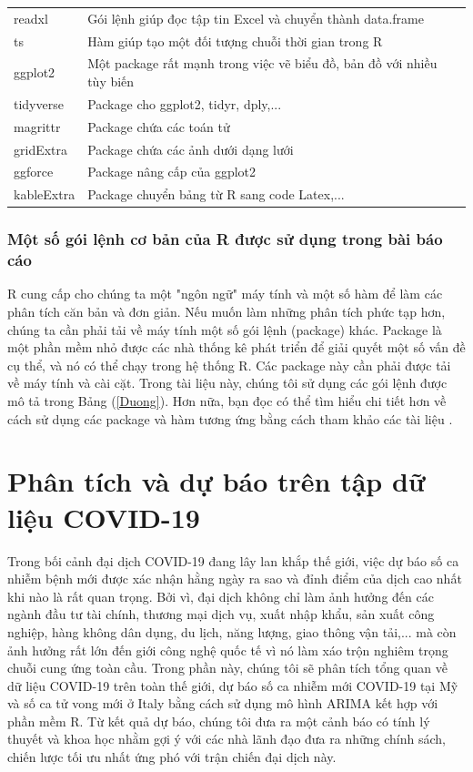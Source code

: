 \documentclass[12pt, a4paper,oneside]{book}
\theoremstyle{definition}
\begin{document}
\begin{longtable}{p{3.2cm}p{11cm}}
	readxl & Gói lệnh giúp đọc tập tin Excel và chuyển thành data.frame \\
	\rowcolor{gray!6} ts  & Hàm giúp tạo một đối tượng chuỗi thời gian trong R \\
	ggplot2 & Một package rất mạnh trong việc vẽ biểu đồ, bản đồ với nhiều tùy biến\\
	\rowcolor{gray!6} tidyverse& Package cho ggplot2, tidyr,  dply,...\\
    magrittr & Package chứa các toán tử\\
    \rowcolor{gray!6}gridExtra & Package chứa các ảnh dưới dạng lưới\\
    ggforce&  Package nâng cấp của ggplot2\\
    \rowcolor{gray!6} kableExtra &Package chuyển bảng từ R sang code Latex,... \\
	\bottomrule
\end{longtable}
\endgroup{} 
\subsubsection*{Một số gói lệnh cơ bản của R được sử dụng trong bài báo cáo}
R cung cấp cho chúng ta một "ngôn ngữ" máy tính và một số hàm để làm các phân tích căn bản và đơn giản. Nếu muốn làm những phân tích phức tạp hơn, chúng ta cần phải tải về máy tính một số gói lệnh (package) khác. Package là một phần mềm nhỏ được các nhà thống kê phát triển để giải quyết một số vấn đề cụ thể, và nó có thể chạy trong hệ thống R. Các package này cần phải được tải về máy tính và cài cặt. Trong tài liệu này, chúng tôi sử dụng các gói lệnh được mô tả trong Bảng (\ref{Duong}). Hơn nữa, bạn đọc có thể tìm hiểu chi tiết hơn về cách sử dụng các package và hàm tương ứng bằng cách tham khảo các tài liệu \cite{10, 11, 12, 13, 14, 15, 16}.
\section{Phân tích và dự báo trên tập dữ liệu COVID-19}
Trong bối cảnh đại dịch COVID-19 đang lây lan khắp thế giới, việc dự báo số ca nhiễm bệnh mới được xác nhận hằng ngày ra sao và đỉnh điểm của dịch cao nhất khi nào là rất quan trọng. Bởi vì, đại dịch không chỉ làm ảnh hưởng đến các ngành đầu tư tài chính, thương mại dịch vụ, xuất nhập khẩu, sản xuất công nghiệp, hàng không dân dụng, du lịch, năng lượng, giao thông vận tải,... mà còn ảnh hưởng rất lớn đến giới công nghệ quốc tế vì nó làm xáo trộn nghiêm trọng chuỗi cung ứng toàn cầu. Trong phần này, chúng tôi sẽ phân tích tổng quan về dữ liệu COVID-19 trên toàn thế giới, dự báo số ca nhiễm mới COVID-19 tại Mỹ và số ca tử vong mới ở Italy bằng cách sử dụng mô hình ARIMA kết hợp với phần mềm R. Từ kết quả dự báo, chúng tôi đưa ra một cảnh báo có tính lý thuyết và khoa học nhằm gợi ý với các nhà lãnh đạo đưa ra những chính sách, chiến lược tối ưu nhất ứng phó với trận chiến đại dịch này.
\end{document}
